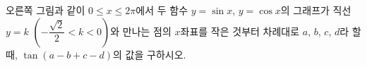 \noindent\begin{minipage}[t]{0.58\linewidth}\vspace{0pt}\raggedright 오른쪽 그림과 같이 $0\le x\le 2\pi$에서 두 함수 $y=\sin x$, $y=\cos x$의 그래프가 직선 $y=k$ $\left(-\dfrac{\sqrt{2}}{2}<k<0\right)$와 만나는 점의 $x$좌표를 작은 것부터 차례대로 $a$, $b$, $c$, $d$라 할 때, $\tan(a-b+c-d)$의 값을 구하시오.\end{minipage}\hfill\begin{minipage}[t]{0.4\linewidth}\vspace{0pt}\centering \resizebox{\ifdim\width>\linewidth\linewidth\else\width\fi}{!}{}\end{minipage}\par

